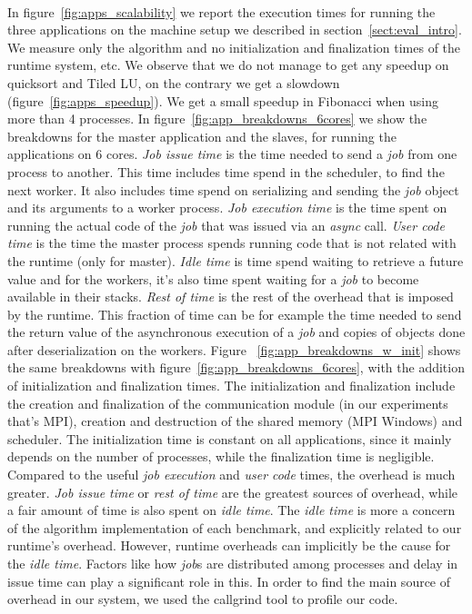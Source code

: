 \paragraph{}
	In figure~\ref{fig:apps_scalability} we report the execution times for running the three applications on the
machine setup we described in section~\ref{sect:eval_intro}.  We measure only the algorithm and no initialization
and finalization times of the runtime system, etc.
We observe that we do not manage to get any speedup 
on quicksort and Tiled LU, on the contrary we get a slowdown (figure~\ref{fig:apps_speedup}).
We get a small speedup in Fibonacci when using more than 4 processes.  
In figure~\ref{fig:app_breakdowns_6cores} 
we show the breakdowns for the master application and the slaves, for running the applications on 6 cores.
\emph{Job issue time} is the time needed to send a \emph{job} from one process to another. This time includes
time spend in the scheduler, to find the next worker.  It also includes time spend on serializing and sending 
the \emph{job} object and its arguments to a worker process.  \emph{Job execution time} is the time spent on 
running the actual code of the 
\emph{job} that was issued via an \emph{async} call.  \emph{User code time} is the time the master process spends
running code that is not related with the runtime (only for master).  
\emph{Idle time} is time spend waiting to retrieve a future 
value and for the workers, it's also time spent waiting for a \emph{job} to become available in their stacks.
\emph{Rest of time} is the rest of the overhead that is imposed by the runtime.  This fraction of time can be for 
example the time needed to send the return value of the asynchronous execution of a \emph{job} and copies
of objects done after deserialization on the workers.
Figure ~\ref{fig:app_breakdowns_w_init} shows the same breakdowns with figure~\ref{fig:app_breakdowns_6cores}, with 
the addition of initialization and finalization times.  The initialization and finalization include the 
creation and finalization of the communication module (in our experiments that's MPI), creation and destruction
of the shared memory (MPI Windows) and scheduler.  The initialization time is constant on all applications, since
it mainly depends on the number of processes, while the finalization time is negligible.
Compared to the useful \emph{job execution} and \emph{user code} times, the overhead is much greater.
\emph{Job issue time} or \emph{rest of time} are the greatest sources of 
overhead, while a fair amount of time is also spent on \emph{idle time}.  The \emph{idle time} is more
a concern of the algorithm implementation of each benchmark, and explicitly related to our runtime's overhead.
However, runtime overheads can implicitly be the cause for the \emph{idle time}.  Factors like how \emph{job}s
are distributed among processes and delay in issue time can play a significant role in this.
In order to find the main source of overhead in our system, we used the callgrind tool
to profile our code.  

